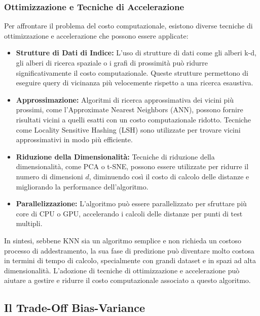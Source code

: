 \subsubsection{Ottimizzazione e Tecniche di Accelerazione}

Per affrontare il problema del costo computazionale, esistono diverse tecniche di ottimizzazione e accelerazione che possono essere applicate:

\begin{itemize}
    \item \textbf{Strutture di Dati di Indice:} L'uso di strutture di dati come gli alberi k-d, gli alberi di ricerca spaziale o i grafi di prossimità può ridurre significativamente il costo computazionale. Queste strutture permettono di eseguire query di vicinanza più velocemente rispetto a una ricerca esaustiva.
    
    \item \textbf{Approssimazione:} Algoritmi di ricerca approssimativa dei vicini più prossimi, come l'Approximate Nearest Neighbors (ANN), possono fornire risultati vicini a quelli esatti con un costo computazionale ridotto. Tecniche come Locality Sensitive Hashing (LSH) sono utilizzate per trovare vicini approssimativi in modo più efficiente.

    \item \textbf{Riduzione della Dimensionalità:} Tecniche di riduzione della dimensionalità, come PCA o t-SNE, possono essere utilizzate per ridurre il numero di dimensioni \( d \), diminuendo così il costo di calcolo delle distanze e migliorando la performance dell'algoritmo.

    \item \textbf{Parallelizzazione:} L'algoritmo può essere parallelizzato per sfruttare più core di CPU o GPU, accelerando i calcoli delle distanze per punti di test multipli.
\end{itemize}

In sintesi, sebbene KNN sia un algoritmo semplice e non richieda un costoso processo di addestramento, la sua fase di predizione può diventare molto costosa in termini di tempo di calcolo, specialmente con grandi dataset e in spazi ad alta dimensionalità. L'adozione di tecniche di ottimizzazione e accelerazione può aiutare a gestire e ridurre il costo computazionale associato a questo algoritmo.

\subsection{Il Trade-Off Bias-Variance}

